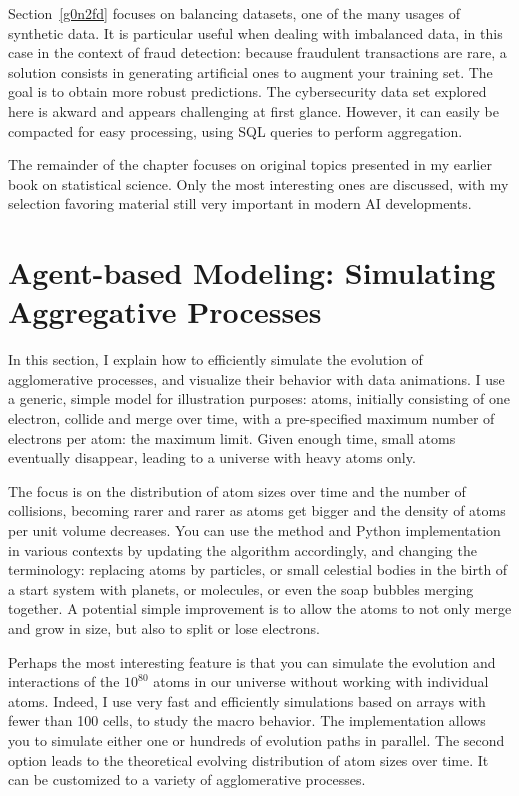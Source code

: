 \documentclass[oneside,10pt]{book}
\begin{document}
Section~\ref{g0n2fd} focuses on balancing datasets, one of the many usages of synthetic data. It is particular useful when dealing 
 with imbalanced data, in this case in the context of fraud detection: because fraudulent transactions are rare, a solution consists in generating
 artificial ones to augment your training set. The goal is to obtain more robust predictions. The cybersecurity data set explored here is akward and appears challenging at first glance.
 However, it can easily be compacted for easy processing, using SQL queries to perform aggregation.

The remainder of the chapter focuses on original topics presented in my earlier book on statistical science. Only the most interesting ones
 are discussed, with my selection favoring material still very important in modern AI developments.  

\section{Agent-based Modeling:  Simulating Aggregative Processes}\label{cfd43wpo}

In this section, I explain how to efficiently simulate the evolution of agglomerative processes, and visualize their behavior
 with data animations. I use a generic, simple model for illustration purposes: atoms, initially consisting of one electron, collide and merge over time, with a pre-specified maximum number of electrons per atom: the maximum limit. Given enough time, small atoms eventually disappear, leading to a universe with heavy atoms only.

The focus is on the distribution of atom sizes over time and the number of collisions, becoming rarer and rarer as atoms get bigger and the density of atoms per unit volume decreases.  You can use the method and Python implementation in various contexts by updating the algorithm accordingly, and changing the terminology: replacing atoms by particles, or small celestial bodies in the birth of a  start system with planets, or molecules, or even the soap bubbles merging together. A potential simple improvement is to allow the atoms to not only merge and grow in size, but also to split or lose electrons.

Perhaps the most interesting feature is that you can simulate the evolution and interactions of the $10^{80}$ atoms in our universe  without working with individual atoms. Indeed, I use very fast and efficiently simulations based on arrays with fewer than 100 cells, to study the macro behavior. The implementation allows you to simulate either one or hundreds of evolution paths in parallel. The second option leads to the theoretical evolving distribution of atom sizes over time.
 It can be customized to a variety of agglomerative processes.
\end{document}
